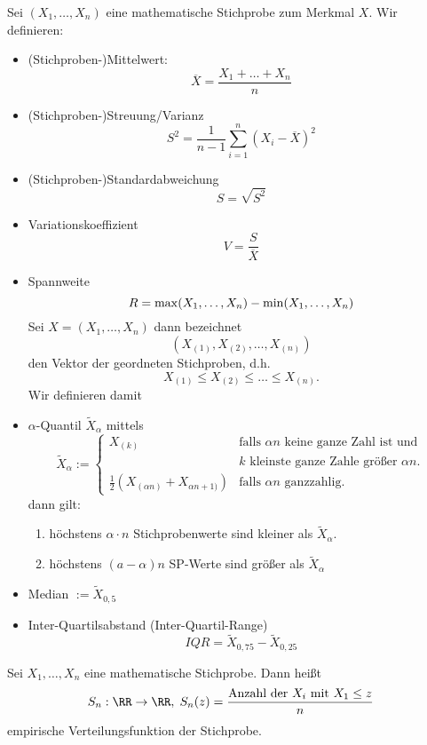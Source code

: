  Sei $(X_1, \ldots, X_n)$ eine mathematische Stichprobe zum Merkmal $X$. Wir definieren:
\begin{itemize}
\item (Stichproben-)Mittelwert:
$$\overline{X}=\frac{X_1+\ldots + X_n}{n}$$
\item (Stichproben-)Streuung/Varianz
$$S^2=\frac{1}{n-1} \sum_{i=1}^n (X_i - \overline{X})^2$$
\item (Stichproben-)Standardabweichung
$$S=\sqrt{S^2}$$
\item Variationskoeffizient
$$V=\frac{S}{\overline{X}}$$
\item Spannweite
$$R=\max (X_1, \ldots, X_n) - \min (X_1, \ldots, X_n) \bigskip$$
Sei $X=(X_1, \ldots, X_n)$ dann bezeichnet 
$$(X_{(1)}, X_{(2)}, \ldots, X_{(n)})$$ 
den Vektor der geordneten Stichproben, d.h. 
$$X_{(1)}\leq X_{(2)} \leq \ldots \leq X_{(n)}\text{.}$$
Wir definieren damit
\item $\alpha$-Quantil $\widetilde{X}_\alpha$ mittels
$$\widetilde{X}_\alpha := \begin{cases}
X_{(k)} & \text{falls }\alpha n\text{ keine ganze Zahl ist und }\\
& k\text{ kleinste ganze Zahle größer }\alpha n\text{.}\\
\frac{1}{2}(X_{(\alpha n)}+X_{\alpha n+1)}) & \text{falls }\alpha n\text{ ganzzahlig.}
\end{cases}$$
dann gilt:
\begin{enumerate}
\item höchstens $\alpha \cdot n$ Stichprobenwerte sind kleiner als $\widetilde{X}_\alpha$.
\item höchstens $(a-\alpha) n$ SP-Werte sind größer als $\widetilde{X}_\alpha$
\end{enumerate}
\item Median $:=\widetilde{X}_{0,5}$
\item Inter-Quartilsabstand (Inter-Quartil-Range)
$$IQR = \widetilde{X}_{0,75}-\widetilde{X}_{0,25}$$
\end{itemize}

 Sei $X_1, \ldots, X_n$ eine mathematische Stichprobe. Dann heißt 
$$S_n: \RR \to \RR, \; S_n(z)= \frac{\text{Anzahl der }X_i\text{ mit } X_1 \leq z}{n}$$
empirische Verteilungsfunktion der Stichprobe.

